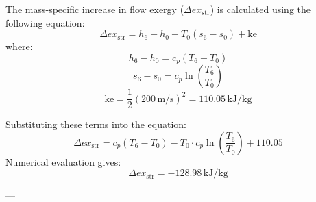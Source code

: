 The mass-specific increase in flow exergy (\( \Delta ex_{\text{str}} \)) is calculated using the following equation:  
\[
\Delta ex_{\text{str}} = h_6 - h_0 - T_0(s_6 - s_0) + \text{ke}
\]  
where:  
\[
h_6 - h_0 = c_p (T_6 - T_0)
\]  
\[
s_6 - s_0 = c_p \ln \left( \frac{T_6}{T_0} \right)
\]  
\[
\text{ke} = \frac{1}{2} \left( 200 \, \text{m/s} \right)^2 = 110.05 \, \text{kJ/kg}
\]  

Substituting these terms into the equation:  
\[
\Delta ex_{\text{str}} = c_p (T_6 - T_0) - T_0 \cdot c_p \ln \left( \frac{T_6}{T_0} \right) + 110.05
\]  
Numerical evaluation gives:  
\[
\Delta ex_{\text{str}} = -128.98 \, \text{kJ/kg}
\]  

---